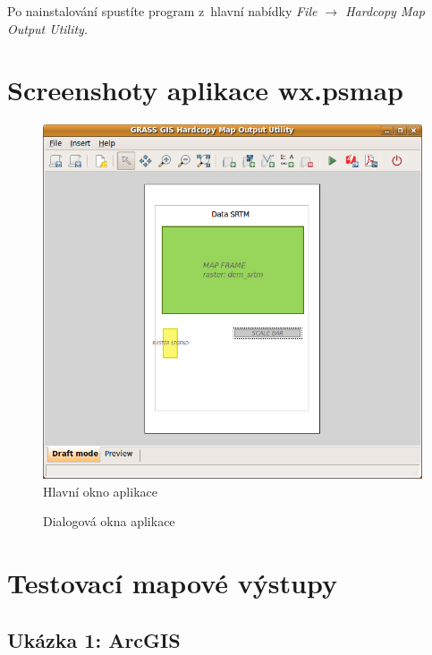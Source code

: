 \documentclass[a4paper,12pt,draft]{article}
\begin{document}
Po nainstalování spustíte program z~hlavní nabídky \emph{File $\rightarrow$ Hardcopy Map Output Utility}.


\newpage
\section{Screenshoty aplikace wx.psmap}
\label{priloha:screenshot:psmap}
\begin{figure}[h!]
  \centering
  \includegraphics[height=0.4\textheight]{./GUI_screenshots/psmap_main.png}
  \caption{Hlavní okno aplikace}
  \label{fig:main}
\end{figure}
\begin{figure}[h!]
\centering
{}
\quad
{}
\caption{Dialogová okna aplikace\label{fig:dialogy}}
\end{figure}

\newpage

\section{Testovací mapové výstupy}
\label{priloha:vystupy}
\subsection{Ukázka 1: ArcGIS}
\label{priloha:vystupy:arcgis1}
\end{document}
